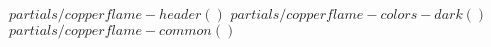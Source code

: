 $ partials/copperflame-header() $
$ partials/copperflame-colors-dark() $
$ partials/copperflame-common() $
